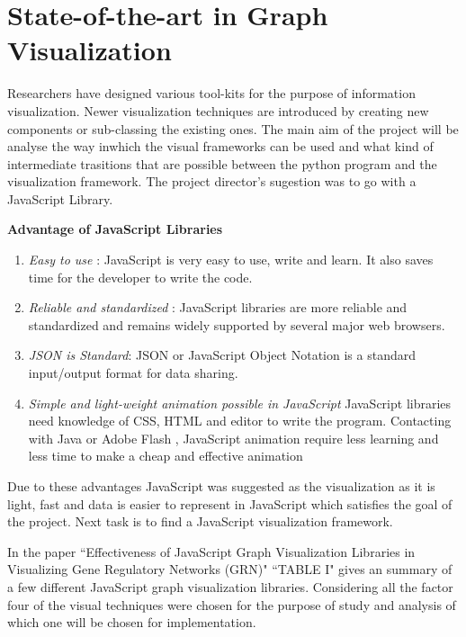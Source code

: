 \section{State-of-the-art in Graph Visualization}
Researchers have designed various tool-kits for the purpose of information visualization. Newer visualization techniques are introduced by creating new components or sub-classing the existing ones. The main aim of the project will be analyse the way inwhich the visual frameworks can be used and what kind of intermediate trasitions that are possible between the python program and the visualization framework. The project director's sugestion was to go with a JavaScript Library.

\textbf{Advantage of JavaScript Libraries} \cite{graphjslib}
\begin{enumerate}
\item \textit{Easy to use} : JavaScript is very easy to use, write and learn. It also saves time for the developer to write the code.
\item \textit{Reliable and standardized} : JavaScript libraries are more reliable and standardized and remains widely supported by several major web browsers. 
\item \textit{JSON is Standard}: JSON or JavaScript Object Notation is a standard input/output format for data sharing.
\item \textit{Simple and light-weight animation possible in JavaScript} JavaScript libraries need knowledge of CSS, HTML and editor to write the program. Contacting with Java or Adobe Flash , JavaScript animation require less learning and less time to make a cheap and effective animation 
\end{enumerate}

Due to these advantages JavaScript was suggested as the visualization as it is light, fast and data is easier to represent in JavaScript which satisfies the goal of the project. Next task is to find a JavaScript visualization framework.  

\par In the paper ``Effectiveness of JavaScript Graph Visualization Libraries in Visualizing Gene Regulatory Networks (GRN)" \cite{graphjslib} ``TABLE I" gives an summary of a few different JavaScript graph visualization libraries. Considering all the factor four of the visual techniques were chosen for the purpose of study and analysis of which one will be chosen for implementation. 
